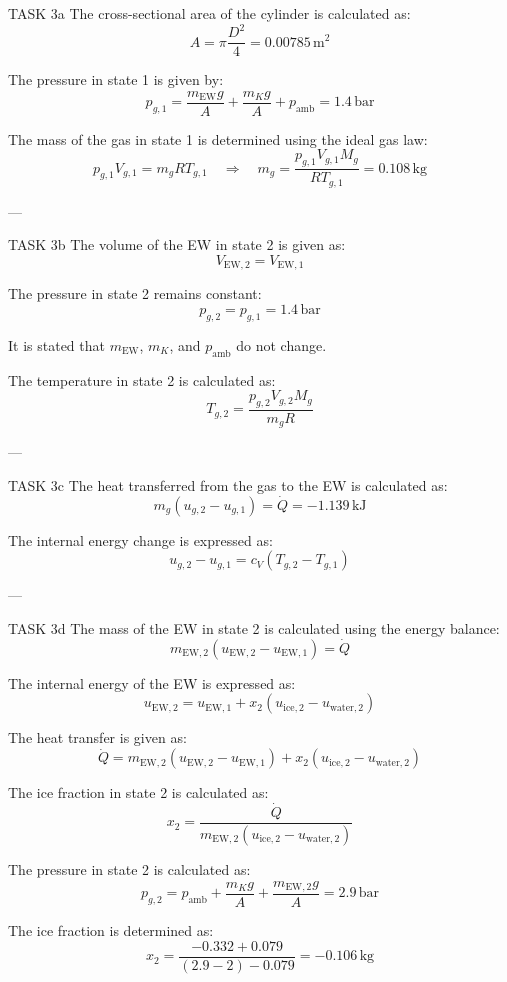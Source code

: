 TASK 3a  
The cross-sectional area of the cylinder is calculated as:  
\[
A = \pi \frac{D^2}{4} = 0.00785 \, \text{m}^2
\]  

The pressure in state 1 is given by:  
\[
p_{g,1} = \frac{m_{\text{EW}} g}{A} + \frac{m_K g}{A} + p_{\text{amb}} = 1.4 \, \text{bar}
\]  

The mass of the gas in state 1 is determined using the ideal gas law:  
\[
p_{g,1} V_{g,1} = m_g R T_{g,1} \quad \Rightarrow \quad m_g = \frac{p_{g,1} V_{g,1} M_g}{R T_{g,1}} = 0.108 \, \text{kg}
\]  

---

TASK 3b  
The volume of the EW in state 2 is given as:  
\[
V_{\text{EW},2} = V_{\text{EW},1}
\]  

The pressure in state 2 remains constant:  
\[
p_{g,2} = p_{g,1} = 1.4 \, \text{bar}
\]  

It is stated that \( m_{\text{EW}} \), \( m_K \), and \( p_{\text{amb}} \) do not change.  

The temperature in state 2 is calculated as:  
\[
T_{g,2} = \frac{p_{g,2} V_{g,2} M_g}{m_g R}
\]  

---

TASK 3c  
The heat transferred from the gas to the EW is calculated as:  
\[
m_g (u_{g,2} - u_{g,1}) = \dot{Q} = -1.139 \, \text{kJ}
\]  

The internal energy change is expressed as:  
\[
u_{g,2} - u_{g,1} = c_V (T_{g,2} - T_{g,1})
\]  

---

TASK 3d  
The mass of the EW in state 2 is calculated using the energy balance:  
\[
m_{\text{EW},2} (u_{\text{EW},2} - u_{\text{EW},1}) = \dot{Q}
\]  

The internal energy of the EW is expressed as:  
\[
u_{\text{EW},2} = u_{\text{EW},1} + x_2 (u_{\text{ice},2} - u_{\text{water},2})
\]  

The heat transfer is given as:  
\[
\dot{Q} = m_{\text{EW},2} (u_{\text{EW},2} - u_{\text{EW},1}) + x_2 (u_{\text{ice},2} - u_{\text{water},2})
\]  

The ice fraction in state 2 is calculated as:  
\[
x_2 = \frac{\dot{Q}}{m_{\text{EW},2} (u_{\text{ice},2} - u_{\text{water},2})}
\]  

The pressure in state 2 is calculated as:  
\[
p_{g,2} = p_{\text{amb}} + \frac{m_K g}{A} + \frac{m_{\text{EW},2} g}{A} = 2.9 \, \text{bar}
\]  

The ice fraction is determined as:  
\[
x_2 = \frac{-0.332 + 0.079}{(2.9 - 2) - 0.079} = -0.106 \, \text{kg}
\]  